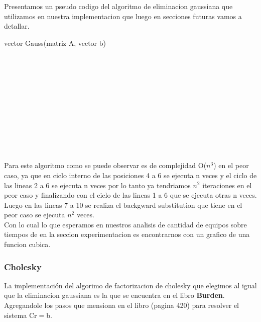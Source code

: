 Presentamos un pseudo codigo del algoritmo de eliminacion gaussiana que utilizamos en nuestra implementacion que luego en secciones futuras vamos a detallar.

\begin{algorithm}
    \begin{algorithmic}[1]\parskip=2mm
        \caption{vector Gauss(matriz A, vector b)}
        \\
        \\
        \\
        \\
        \\
        \\
        \\
        \\
        \\
        \\
    \end{algorithmic}
\end{algorithm}

Para este algoritmo como se puede observar es de complejidad O($n^3$) en el peor caso, ya que en ciclo interno de las posiciones 4 a 6 se ejecuta n veces y el ciclo de las lineas 2 a 6 se ejecuta n veces por lo tanto ya tendriamos $n^2$ iteraciones en el peor caso y finalizando con el ciclo de las lineas 1 a 6 que se ejecuta otras n veces.
Luego en las lineas 7 a 10 se realiza el backgward substitution  que tiene en el peor caso se ejecuta $n^2$ veces.\\
Con lo cual lo que esperamos en nuestros analisis de cantidad de equipos sobre tiempos de en la seccion experimentacion es encontrarnos con un grafico de una funcion cubica.

\newpage
\subsubsection{Cholesky}

La implementación del algorimo de factorizacion de cholesky que elegimos al igual que la eliminacion gaussiana es la que se encuentra en el libro \textbf{Burden}.
Agregandole los pasos que mensiona en el libro (pagina 420) para resolver el sistema Cr$=$b.\\

